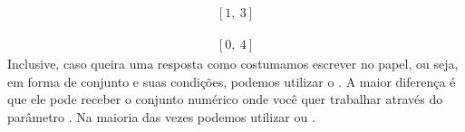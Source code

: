 \documentclass[letterpaper,10pt,english]{jupyterBook}
\begin{document}
\begin{sphinxVerbatim}[commandchars=\\\{\}]
     
\end{sphinxVerbatim}
\begin{equation*}
\begin{split}\displaystyle \left[ 1, \  3\right]\end{split}
\end{equation*}
\begin{sphinxVerbatim}[commandchars=\\\{\}]
  
\end{sphinxVerbatim}
\begin{equation*}
\begin{split}\displaystyle \left[ 0, \  4\right]\end{split}
\end{equation*}
\sphinxAtStartPar
Inclusive, caso queira uma resposta como costumamos escrever no papel, ou seja, em forma de conjunto e suas condições, podemos utilizar o . A maior diferença é que ele pode receber o conjunto numérico onde você quer trabalhar através do parâmetro . Na maioria das vezes podemos utilizar  ou .
\end{document}
